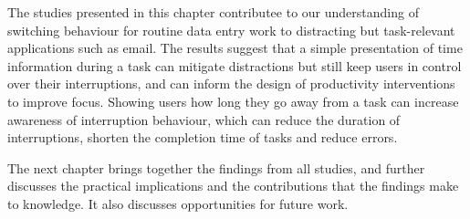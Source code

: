 The studies presented in this chapter contributee to our understanding of switching behaviour for routine data entry work to distracting but task-relevant applications such as email. The results suggest that a simple presentation of time information during a task can mitigate distractions but still keep users in control over their interruptions, and can inform the design of productivity interventions to improve focus. Showing users how long they go away from a task can increase awareness of interruption behaviour, which can reduce the duration of interruptions, shorten the completion time of tasks and reduce errors.

The next chapter brings together the findings from all studies, and further discusses the practical implications and the contributions that the findings make to knowledge. It also discusses opportunities for future work.